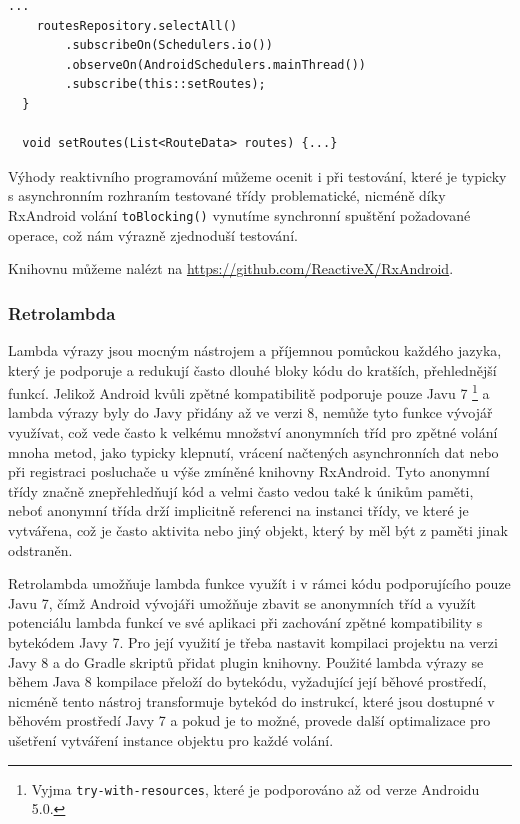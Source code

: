 \documentclass{article}
\begin{document}
\begin{lstlisting}[label=rxmainthreaddeliver,caption=Reakce na událost v UI vlákně pomocí RxAndorid]
    ...
    routesRepository.selectAll()
        .subscribeOn(Schedulers.io())
        .observeOn(AndroidSchedulers.mainThread())
        .subscribe(this::setRoutes);
  }

  void setRoutes(List<RouteData> routes) {...}
\end{lstlisting}

Výhody reaktivního programování můžeme ocenit i při testování, které je typicky s asynchronním
rozhraním testované třídy problematické, nicméně díky RxAndroid volání \texttt{toBlocking()} vynutíme
synchronní spuštění požadované operace, což nám výrazně zjednoduší testování.

Knihovnu můžeme nalézt na \url{https://github.com/ReactiveX/RxAndroid}.

\subsubsection{Retrolambda}
Lambda výrazy jsou mocným nástrojem a příjemnou pomůckou každého jazyka, který je podporuje a redukují
často dlouhé bloky kódu do kratších, přehlednější funkcí. Jelikož Android kvůli zpětné
kompatibilitě podporuje pouze Javu 7
\footnote{Vyjma \texttt{try-with-resources}, které je podporováno až od verze Androidu 5.0.}
a lambda výrazy byly do Javy přidány až ve verzi 8, nemůže tyto funkce vývojář využívat,
což vede často k velkému množství anonymních tříd pro zpětné volání mnoha metod, jako typicky klepnutí,
vrácení načtených asynchronních dat nebo při registraci posluchače u výše zmíněné knihovny RxAndroid.
Tyto anonymní třídy značně znepřehledňují kód a velmi často vedou také k únikům paměti,
neboť anonymní třída drží implicitně referenci na instanci třídy, ve které je vytvářena, což je často
aktivita nebo jiný objekt, který by měl být z paměti jinak odstraněn.

Retrolambda umožňuje lambda funkce využít i v rámci kódu podporujícího pouze Javu 7,
čímž Android vývojáři umožňuje zbavit se anonymních tříd a využít potenciálu lambda funkcí
ve své aplikaci při zachování zpětné kompatibility s bytekódem Javy 7. Pro její využití je třeba
nastavit kompilaci projektu na verzi Javy 8 a do Gradle skriptů přidat plugin knihovny. Použité
lambda výrazy se během Java 8 kompilace přeloží do bytekódu, vyžadující její běhové prostředí,
nicméně tento nástroj transformuje bytekód do instrukcí, které jsou dostupné v běhovém prostředí
Javy 7 a pokud je to možné, provede další optimalizace pro ušetření vytváření instance objektu
pro každé volání.
\end{document}
